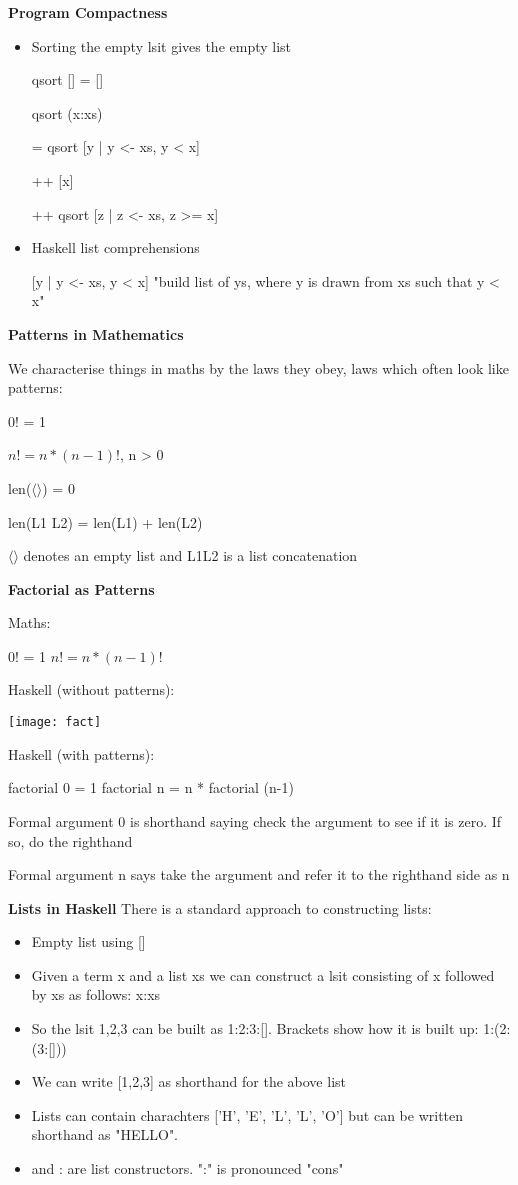 \documentclass{article}
\begin{document}
\textbf{Program Compactness}


\begin{itemize}
\item Sorting the empty lsit gives the empty list

qsort [] = []

qsort (x:xs)

= qsort [y | y <- xs, y < x]

	++ [x]

	++ qsort [z | z <- xs, z >= x]

\item Haskell list comprehensions

[y | y <- xs, y < x] "build list of ys, where y is drawn from xs such that y < x"
\end{itemize}

\textbf{Patterns in Mathematics}

We characterise things in maths by the laws they obey, laws which often look like patterns:

0! = 1

$n! = n *(n -1)!$,         n > 0

len($\langle \rangle$) = 0

len(L1 L2) = len(L1) + len(L2)

$\langle \rangle$ denotes an empty list and L1L2 is a list concatenation


\textbf{Factorial as Patterns}

Maths:

0! = 1
$n! = n * (n -1)!$


Haskell (without patterns):

\texttt{[image: fact]}


Haskell (with patterns):

factorial 0 = 1
factorial n = n * factorial (n-1)

Formal argument 0 is shorthand saying check the argument to see if it is zero. If so, do the righthand

Formal argument n says take the argument and refer it to the righthand side as n


\textbf{Lists in Haskell}
There is a standard approach to constructing lists:
\begin{itemize}
\item Empty list using []
\item Given a term x and a list xs we can construct a lsit consisting of x followed by xs as follows: x:xs
\item So the lsit 1,2,3 can be built as 1:2:3:[]. Brackets show how it is built up: 1:(2:(3:[]))
\item We can write [1,2,3] as shorthand for the above list
\item Lists can contain charachters ['H', 'E', 'L', 'L', 'O'] but can be written shorthand as "HELLO".
\item [] and : are list constructors. ":" is pronounced "cons"
\end{itemize}
\end{document}
